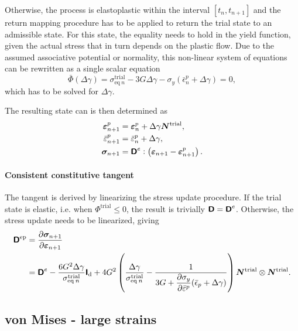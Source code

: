 Otherwise, the process is elastoplastic within the interval \(\left[t_{n}, t_{n+1}\right]\) and the return mapping procedure has to be applied to return the trial state to an admissible state.
For this state, the equality needs to hold in the yield function, given the actual stress that in turn depends on the plastic flow.
Due to the assumed associative potential or normality, this non-linear system of equations can be rewritten as a single scalar equation
\begin{equation}
\bar{\Phi}(\Delta \gamma)= \sigma_{\text{eq}\:n}^\text{trial}-3 G \Delta \gamma-\sigma_y(\bar{\epsilon}_n^p+\Delta \gamma)=0,
\end{equation}
which has to be solved for \(\Delta \gamma\).

The resulting state can is then determined as
\begin{align}
\bm\varepsilon^p_{n+1}&=\bm\varepsilon^p_n+\Delta \gamma \bm{N}^\text{trial}, \\
\bar{\varepsilon}^p_{n+1}&=\bar{\varepsilon}^p_n+\Delta \gamma,\\
\bm\sigma_{n+1}&=\boldsymbol{\mathsf{D}}^e:\left(\bm\varepsilon_{n+1}-\bm\varepsilon^p_ {n+1}\right).
\end{align}



\paragraph{Consistent constitutive tangent}
The tangent is derived by linearizing the stress update procedure.
If the trial state is elastic, i.e. when \(\Phi^\text{trial} \leq 0\), the result is trivially \(\boldsymbol{\mathsf{D}}=\boldsymbol{\mathsf{D}}^e\).
Otherwise, the stress update needs to be linearized, giving
\begin{equation}
\begin{aligned}
\boldsymbol{\mathsf{D}}^\text{ep} &=\frac{\partial \bm{\sigma}_ {n+1}}{\partial \bm \varepsilon_ {n+1}} \\
&=\boldsymbol{\mathsf{D}}^e-\frac{6 G^{2} \Delta \gamma}{\sigma_{\mathrm{eq}\:n}^\text{trial}} \boldsymbol{\mathsf{I}}_{\mathrm{d}}+4 G^{2}\left(\frac{\Delta \gamma}{\sigma_{\mathrm{eq}\:n}^\text{trial}}-\frac{1}{3 G+ \displaystyle{\frac{\partial \sigma_y}{\partial \bar{\varepsilon}^p}}(\bar{\epsilon}_p+\Delta \gamma)}\right)\bm N^\text{trial} \otimes\bm N^\text{trial}.
\end{aligned}
\end{equation}

\subsection{von Mises - large strains}

